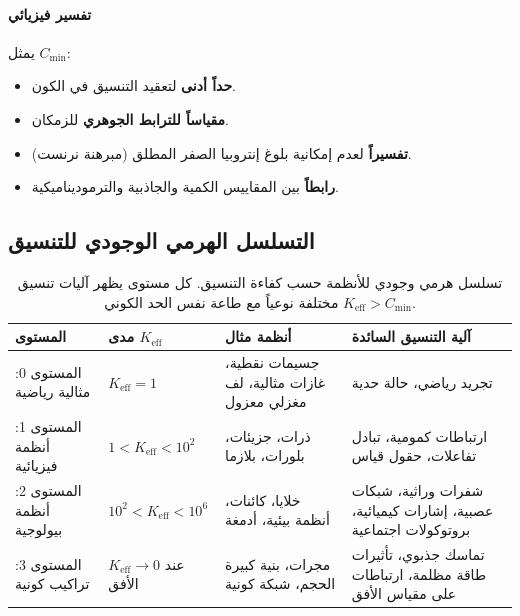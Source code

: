 \documentclass[11pt,a4paper]{article}
\begin{document}
	\paragraph{تفسير فيزيائي}
	يمثل $C_{\min}$:
	\begin{itemize}
		\item \textbf{حداً أدنى} لتعقيد التنسيق في الكون.
		\item \textbf{مقياساً للترابط الجوهري} للزمكان.
		\item \textbf{تفسيراً} لعدم إمكانية بلوغ إنتروبيا الصفر المطلق (مبرهنة نرنست).
		\item \textbf{رابطاً} بين المقاييس الكمية والجاذبية والترموديناميكية.
	\end{itemize}
	
	\subsection{التسلسل الهرمي الوجودي للتنسيق}
	
	\begin{table}[htbp]
		\centering
		\small
		\begin{english}
			\begin{tabular}{|p{}|p{}|p{}|p{}|}
				\hline
				\textbf{المستوى} & \textbf{مدى $K_{\mathrm{eff}}$} & \textbf{أنظمة مثال} & \textbf{آلية التنسيق السائدة} \\
				\hline
				المستوى 0: مثالية رياضية & $K_{\mathrm{eff}} = 1$ & جسيمات نقطية، غازات مثالية، لف مغزلي معزول & تجريد رياضي، حالة حدية \\
				\hline
				المستوى 1: أنظمة فيزيائية & $1 < K_{\mathrm{eff}} < 10^2$ & ذرات، جزيئات، بلورات، بلازما & ارتباطات كمومية، تبادل تفاعلات، حقول قياس \\
				\hline
				المستوى 2: أنظمة بيولوجية & $10^2 < K_{\mathrm{eff}} < 10^6$ & خلايا، كائنات، أنظمة بيئية، أدمغة & شفرات وراثية، شبكات عصبية، إشارات كيميائية، بروتوكولات اجتماعية \\
				\hline
				المستوى 3: تراكيب كونية & $K_{\mathrm{eff}} \to 0$ عند الأفق & مجرات، بنية كبيرة الحجم، شبكة كونية & تماسك جذبوي، تأثيرات طاقة مظلمة، ارتباطات على مقياس الأفق \\
				\hline
			\end{tabular}
		\end{english}
		\caption{تسلسل هرمي وجودي للأنظمة حسب كفاءة التنسيق. كل مستوى يظهر آليات تنسيق مختلفة نوعياً مع طاعة نفس الحد الكوني $K_{\mathrm{eff}} > C_{\min}$.}
		\label{tab:ontology-hierarchy}
	\end{table}
	
\end{document}
